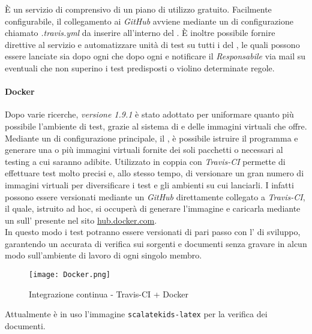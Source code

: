 \documentclass{scalatekids-article}
\begin{document}
È un servizio di  comprensivo di un piano di
utilizzo gratuito. Facilmente configurabile, il collegamento ai 
\textit{GitHub} avviene mediante un  di configurazione chiamato \textit{.travis.yml}
da inserire all'interno del . È inoltre possibile fornire
direttive al servizio e automatizzare unità di test su tutti i  del
, le quali possono essere lanciate sia dopo ogni 
che dopo ogni  e notificare il \textit{Responsabile} via mail su
eventuali  che non superino i test predisposti o violino
determinate regole.

\paragraph{Docker}

Dopo varie ricerche, \textit{ versione 1.9.1} è stato adottato per uniformare quanto più
possibile l'ambiente di test, grazie al sistema di  e
 delle immagini virtuali che offre.\\ Mediante un  di
configurazione principale, il , è possibile istruire il
programma e generare una o più immagini virtuali fornite dei soli pacchetti o
 necessari al testing a cui saranno adibite. Utilizzato in coppia con
\textit{Travis-CI} permette di effettuare test molto precisi e, allo stesso
tempo, di versionare un gran numero di immagini virtuali per diversificare i test e
gli ambienti su cui lanciarli. I  infatti possono essere
versionati mediante un  \textit{GitHub} direttamente collegato a
\textit{Travis-CI}, il quale, istruito ad hoc, si occuperà di generare
l'immagine  e caricarla mediante un  sull'
 presente nel sito \url{hub.docker.com}.\\ In questo modo i test
potranno essere versionati di pari passo con l' di sviluppo, garantendo
un accurata  di verifica sui sorgenti e documenti senza gravare in alcun
modo sull'ambiente di lavoro di ogni singolo membro.
\begin{figure}[H]
    \centering
    \texttt{[image: Docker.png]}
    \caption{Integrazione continua - Travis-CI + Docker}
\end{figure}
Attualmente è in uso l'immagine \verb=scalatekids-latex= per la verifica dei documenti.
\end{document}
